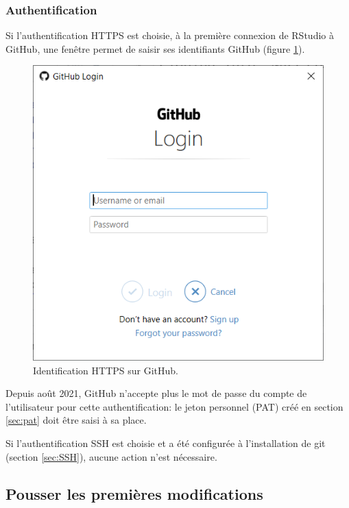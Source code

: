 \documentclass[
  12pt,
  french,
  a4paper,
  extrafontsizes,onecolumn,openright
  ]{memoir}
\begin{document}
\hypertarget{authentification}{%
\subsubsection{Authentification}\label{authentification}}

Si l'authentification HTTPS est choisie, à la première connexion de RStudio à GitHub, une fenêtre permet de saisir ses identifiants GitHub (figure \ref{fig:git-PAT}).



\scriptsize

\begin{figure}

{\centering \includegraphics[width=0.8\linewidth]{images/git-PAT} 

}

\caption{Identification HTTPS sur GitHub.}\label{fig:git-PAT}
\end{figure}

\normalsize

Depuis août 2021, GitHub n'accepte plus le mot de passe du compte de l'utilisateur pour cette authentification: le jeton personnel (PAT) créé en section \ref{sec:pat} doit être saisi à sa place.

Si l'authentification SSH est choisie et a été configurée à l'installation de git (section \ref{sec:SSH}), aucune action n'est nécessaire.

\hypertarget{pousser-les-premiuxe8res-modifications}{%
\subsection{Pousser les premières modifications}\label{pousser-les-premiuxe8res-modifications}}
\end{document}
